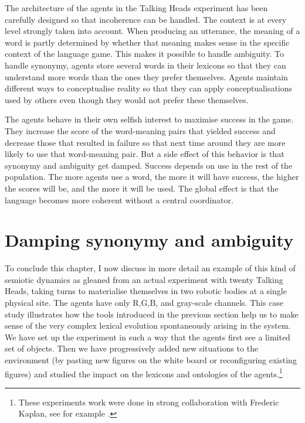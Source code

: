The architecture of the agents in the Talking Heads
experiment has been carefully designed so that incoherence
can be handled. The context
is at every level strongly taken into account. When 
producing an utterance, the meaning of a word is partly
determined by whether
that meaning makes sense in the specific context
of the language game. This makes it possible to 
handle ambiguity. To handle synonymy, agents store several words in 
their lexicons so that they can understand more words
than the ones they prefer themselves. Agents maintain 
different ways to conceptualise reality so that 
they can apply conceptualisations used by others
even though they would not prefer these themselves. 

The agents behave in their own selfish interest to 
maximise success in the game. They increase the score 
of the word-meaning pairs that yielded success and decrease
those that resulted in failure so that next time around 
they are more likely to use that word-meaning pair. 
But a side effect of this behavior is 
that synonymy and ambiguity get damped. Success depends 
on use in the rest of the population. The more 
agents use a word, the more it will have success, 
the higher the scores will be, and the more it will be used. 
The global effect is that the language becomes more
coherent without a central coordinator. 

\section{Damping synonymy and ambiguity}

To conclude this chapter, I now discuss in more 
detail an example of this kind of semiotic dynamics as
gleaned from  an actual experiment with twenty Talking
Heads, taking turns to materialise themselves in two robotic 
bodies at a single physical site. The agents have 
only R,G,B, and gray-scale channels. This 
case study illustrates how the tools introduced in 
the previous section help us to make sense of
the very complex lexical evolution spontaneously 
arising in the system. We have set up the experiment
in such a way that the agents first see a limited set 
of objects. Then we
have progressively added new situations
to the environment (by pasting new figures on 
the white board or reconfiguring existing figures) and studied
the impact on the lexicons and ontologies of the agents.\footnote{
These experiments work were done in strong collaboration with 
Frederic Kaplan, see for example \cite{Steels:1999}.}

